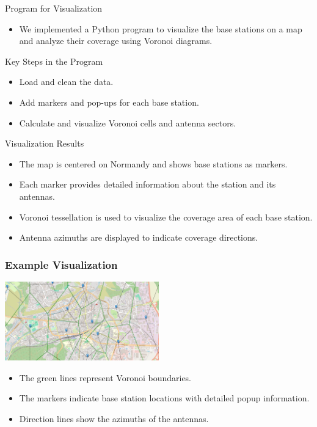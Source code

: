 \begin{frame}{Program for Visualization}
    \begin{itemize}
        \item We implemented a Python program to visualize the base stations on a map and analyze their coverage using Voronoi diagrams.
    \end{itemize}
    \begin{block}{Key Steps in the Program}
        \begin{itemize}
            \item Load and clean the data.
            \item Add markers and pop-ups for each base station.
            \item Calculate and visualize Voronoi cells and antenna sectors.
        \end{itemize}
    \end{block}    
    \begin{block}{Visualization Results}
        \begin{itemize}
            \item The map is centered on Normandy and shows base stations as markers.
            \item Each marker provides detailed information about the station and its antennas.
            \item Voronoi tessellation is used to visualize the coverage area of each base station.
            \item Antenna azimuths are displayed to indicate coverage directions.
        \end{itemize}
    \end{block}
\end{frame}

\begin{frame}
    \frametitle{Example Visualization}
    \begin{center}
        \includegraphics[width=0.5\textwidth]{images/Altair/antenn-vizualization.png}
    \end{center}
    \begin{itemize}
        \item The green lines represent Voronoi boundaries.
        \item The markers indicate base station locations with detailed popup information.
        \item Direction lines show the azimuths of the antennas.
    \end{itemize}
\end{frame}

